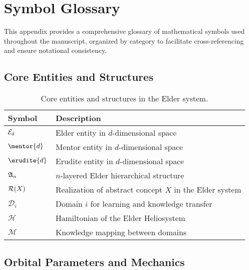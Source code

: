 \chapter{Symbol Glossary}

This appendix provides a comprehensive glossary of mathematical symbols used throughout the manuscript, organized by category to facilitate cross-referencing and ensure notational consistency.

\section{Core Entities and Structures}

\begin{table}[h]
\centering
\begin{tabular}{|l|p{10cm}|}
\hline
\textbf{Symbol} & \textbf{Description} \\
\hline
$\mathcal{E}_{d}$ & Elder entity in $d$-dimensional space \\
\hline
$\mentor{d}$ & Mentor entity in $d$-dimensional space \\
\hline
$\erudite{d}$ & Erudite entity in $d$-dimensional space \\
\hline
$\mathfrak{A}_{n}$ & $n$-layered Elder hierarchical structure \\
\hline
$\mathcal{R}(X)$ & Realization of abstract concept $X$ in the Elder system \\
\hline
$\mathcal{D}_i$ & Domain $i$ for learning and knowledge transfer \\
\hline
$\mathcal{H}$ & Hamiltonian of the Elder Heliosystem \\
\hline
$\mathcal{M}$ & Knowledge mapping between domains \\
\hline
\end{tabular}
\caption{Core entities and structures in the Elder system.}
\label{tab:symbols_core}
\end{table}

\section{Orbital Parameters and Mechanics}

